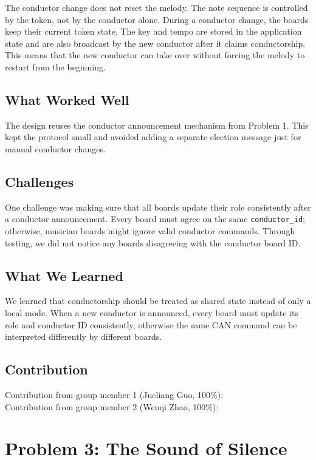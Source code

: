 \documentclass[11pt,a4paper]{article}
\begin{document}
The conductor change does not reset the melody. The note sequence is controlled by the token, not by the conductor alone. During a conductor change, the boards keep their current token state. The key and tempo are stored in the application state and are also broadcast by the new conductor after it claims conductorship. This means that the new conductor can take over without forcing the melody to restart from the beginning.

\subsection*{What Worked Well}

The design reuses the conductor announcement mechanism from Problem 1. This kept the protocol small and avoided adding a separate election message just for manual conductor changes.

\subsection*{Challenges}

One challenge was making sure that all boards update their role consistently after a conductor announcement. Every board must agree on the same \texttt{conductor\_\allowbreak{}id}; otherwise, musician boards might ignore valid conductor commands. Through testing, we did not notice any boards disagreeing with the conductor board ID.

\subsection*{What We Learned}

We learned that conductorship should be treated as shared state instead of only a local mode. When a new conductor is announced, every board must update its role and conductor ID consistently, otherwise the same CAN command can be interpreted differently by different boards.

\subsection*{Contribution}

Contribution from group member 1 (Jueliang Guo, 100\%):\\
Contribution from group member 2 (Wenqi Zhao, 100\%):

\section*{Problem 3: The Sound of Silence}
\end{document}
